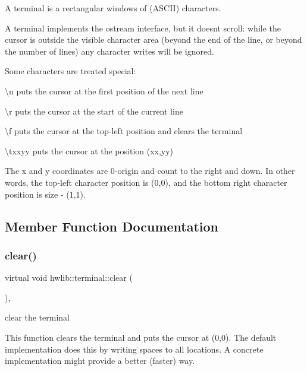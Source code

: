 A terminal is a rectangular windows of (A\+S\+C\+II) characters.

A terminal implements the ostream interface, but it doesn\textquotesingle{}t scroll\+: while the cursor is outside the visible character area (beyond the end of the line, or beyond the number of lines) any character writes will be ignored.

Some characters are treated special\+:
\begin{DoxyItemize}
\item \textquotesingle{}\textbackslash{}n\textquotesingle{} puts the cursor at the first position of the next line
\item \textquotesingle{}\textbackslash{}r\textquotesingle{} puts the cursor at the start of the current line
\item \textquotesingle{}\textbackslash{}f\textquotesingle{} puts the cursor at the top-\/left position and clears the terminal
\item \textquotesingle{}\textbackslash{}txxyy\textquotesingle{} puts the cursor at the position (xx,yy)
\end{DoxyItemize}

The x and y coordinates are 0-\/origin and count to the right and down. In other words, the top-\/left character position is (0,0), and the bottom right character position is size -\/ (1,1).

 

\subsection{Member Function Documentation}
\mbox{\label{classhwlib_1_1terminal_a89b385b6e92fd9d37e7ac16126ba8f32}} 
\subsubsection{\texorpdfstring{clear()}{clear()}}
{\footnotesize\ttfamily virtual void hwlib\+::terminal\+::clear (\begin{DoxyParamCaption}{ }\end{DoxyParamCaption})\hspace{0.3cm}{\ttfamily [inline]}, {\ttfamily [virtual]}}

clear the terminal

This function clears the terminal and puts the cursor at (0,0). The default implementation does this by writing spaces to all locations. A concrete implementation might provide a better (faster) way. 

